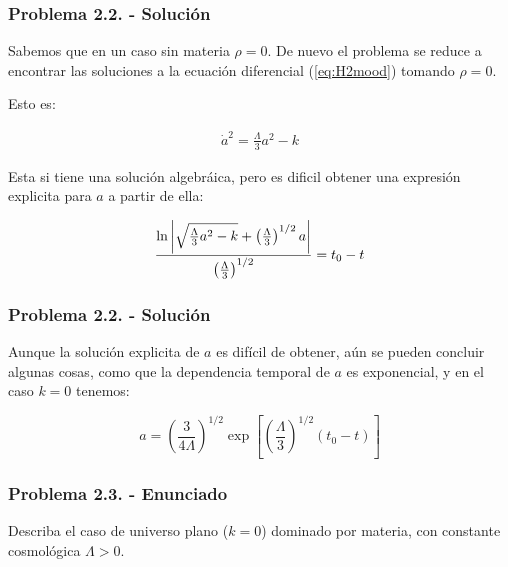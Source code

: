 \begin{frame}
    \frametitle{Problema 2.2. - Solución}

    Sabemos que en un caso sin materia $\rho = 0$. De nuevo el problema se reduce a encontrar las soluciones a la ecuación diferencial (\ref{eq:H2mood}) tomando $\rho=0$.

    Esto es:

    \begin{align*}
       \dot{a}^2 = \frac{\Lambda}{3}a^2-k
    \end{align*}


    Esta si tiene una solución algebráica, pero es dificil obtener una expresión explicita para $a$ a partir de ella:

    \begin{align*}
        \frac{\ln\abs{\sqrt{\frac{\Lambda}{3}a^2-k}+\left(\frac{\Lambda}{3}\right)^{1/2}a}}{\left(\frac{\Lambda}{3}\right)^{1/2}} = t_0 - t
    \end{align*}

\end{frame}

\begin{frame}
    \frametitle{Problema 2.2. - Solución}

    Aunque la solución explicita de $a$ es difícil de obtener, aún se pueden concluir algunas cosas, como que la dependencia temporal de $a$ es exponencial, y en el caso $k = 0$ tenemos:

    \begin{equation*}
        a = \left(\frac{3}{4\Lambda}\right)^{1/2}\exp\left[\left(\frac{\Lambda}{3}\right)^{1/2}\left(t_0-t\right)\right]
    \end{equation*}

\end{frame}

\begin{frame}
    \frametitle{Problema 2.3. - Enunciado}

    Describa el caso de universo plano ($k=0$) dominado por materia, con constante cosmológica $\Lambda > 0$.

\end{frame}

